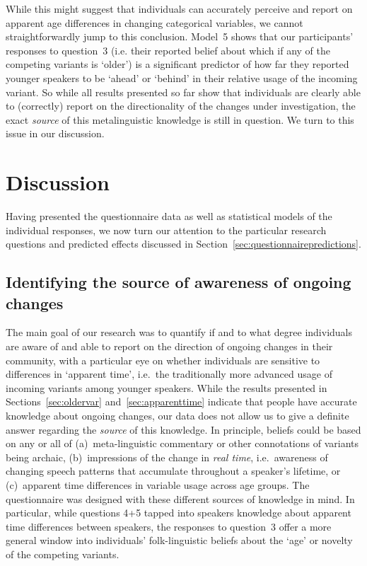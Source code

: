 While this might suggest that individuals can accurately perceive and report on apparent age differences in changing categorical variables, we cannot straightforwardly jump to this conclusion. Model~5 shows that our participants' responses to question~3 (i.e. their reported belief about which if any of the competing variants is `older') %
is a significant predictor of how far they reported younger speakers to be `ahead' or `behind' in their relative usage of the incoming variant.
So while all results presented so far show that individuals are clearly able to (correctly) report on the directionality of the changes under investigation, the exact \emph{source} of this metalinguistic knowledge is still in question. We turn to this issue in our discussion.

\section{Discussion}

Having presented the questionnaire data as well as statistical models of the individual responses, we now turn our attention to the particular research questions and predicted effects discussed in Section~\ref{sec:questionnairepredictions}.

\subsection{Identifying the source of awareness of ongoing changes}
\label{sec:questionorder}

The main goal of our research was to quantify if and to what degree individuals are aware of and able to report on the direction of ongoing changes in their community, with a particular eye on whether individuals are sensitive to differences in `apparent time', i.e.~the traditionally more advanced usage of incoming variants among younger speakers.
While the results presented in Sections~\ref{sec:oldervar} and~\ref{sec:apparenttime} indicate that people have accurate knowledge about ongoing changes, our data does not allow us to give a definite answer regarding the \emph{source} of this knowledge.
In principle, beliefs could be based on any or all of (a)~meta-linguistic commentary or other connotations of variants being archaic, (b)~impressions of the change in \emph{real time}, i.e.~awareness of changing speech patterns that accumulate throughout a speaker's lifetime, or (c)~apparent time differences in variable usage across age groups.
The questionnaire was designed with these different sources of knowledge in mind. In particular, while questions 4+5 tapped into speakers knowledge about apparent time differences between speakers, the responses to question~3 offer a more general window into individuals' folk-linguistic beliefs about the `age' or novelty of the competing variants.


